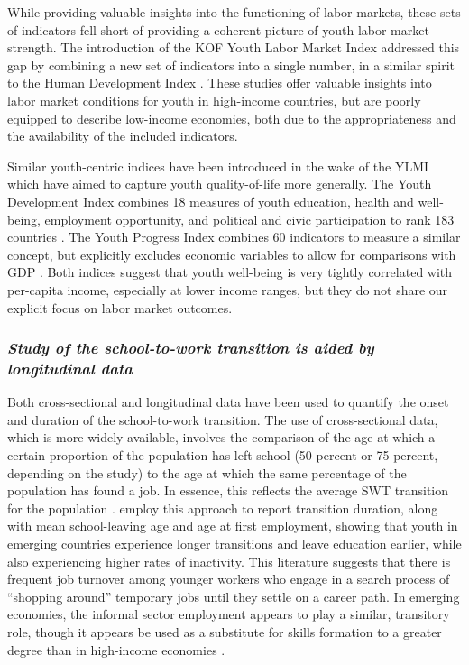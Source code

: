 \documentclass[
  a4paper, twoside, 12pt]{book}
\begin{document}
While providing valuable insights into the functioning of labor markets, these sets of indicators fell short of providing a coherent picture of youth labor market strength. The introduction of the KOF Youth Labor Market Index \autocite{renold2014,pusterla2015,pusterla2016} addressed this gap by combining a new set of indicators into a single number, in a similar spirit to the Human Development Index \autocite{sudhir1994}. These studies offer valuable insights into labor market conditions for youth in high-income countries, but are poorly equipped to describe low-income economies, both due to the appropriateness and the availability of the included indicators.

Similar youth-centric indices have been introduced in the wake of the YLMI which have aimed to capture youth quality-of-life more generally. The Youth Development Index combines 18 measures of youth education, health and well-being, employment opportunity, and political and civic participation to rank 183 countries \autocite{sen2016}. The Youth Progress Index combines 60 indicators to measure a similar concept, but explicitly excludes economic variables to allow for comparisons with GDP \autocite{lisney2018}. Both indices suggest that youth well-being is very tightly correlated with per-capita income, especially at lower income ranges, but they do not share our explicit focus on labor market outcomes.

\hypertarget{study-of-the-school-to-work-transition-is-aided-by-longitudinal-data}{%
\subsubsection*{\texorpdfstring{\emph{Study of the school-to-work transition is aided by longitudinal data}}{Study of the school-to-work transition is aided by longitudinal data}}\label{study-of-the-school-to-work-transition-is-aided-by-longitudinal-data}}

Both cross-sectional and longitudinal data have been used to quantify the onset and duration of the school-to-work transition. The use of cross-sectional data, which is more widely available, involves the comparison of the age at which a certain proportion of the population has left school (50 percent or 75 percent, depending on the study) to the age at which the same percentage of the population has found a job. In essence, this reflects the average SWT transition for the population \autocite{nilsson2019}. \textcite{quintini2014} employ this approach to report transition duration, along with mean school-leaving age and age at first employment, showing that youth in emerging countries experience longer transitions and leave education earlier, while also experiencing higher rates of inactivity. This literature suggests that there is frequent job turnover among younger workers who engage in a search process of ``shopping around'' temporary jobs until they settle on a career path. In emerging economies, the informal sector employment appears to play a similar, transitory role, though it appears be used as a substitute for skills formation to a greater degree than in high-income economies \autocite{cunningham2008,bosch2010}.
\end{document}
